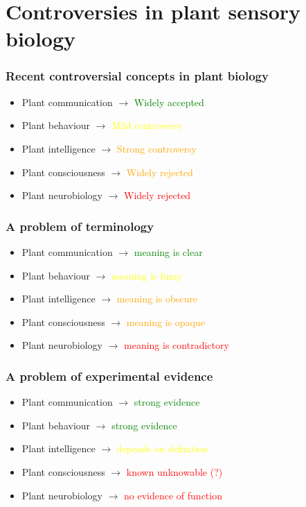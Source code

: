 \documentclass[10pt]{beamer}
\begin{document}
\section{Controversies in plant sensory biology}

\begin{frame}
\frametitle{Recent controversial concepts in plant biology}
\begin{itemize}
\item Plant communication $\rightarrow$ \textcolor{green}{Widely accepted}
\item Plant behaviour $\rightarrow$ \textcolor{yellow}{Mild controversy}
\item Plant intelligence $\rightarrow$ \textcolor{orange}{Strong controversy}
\item Plant consciousness $\rightarrow$ \textcolor{orange}{Widely rejected}
\item Plant neurobiology $\rightarrow$ \textcolor{red}{Widely rejected}
\end{itemize}
\end{frame}

\begin{frame}
\frametitle{A problem of terminology}
\begin{itemize}
\item Plant communication $\rightarrow$ \textcolor{green}{meaning is clear}
\item Plant behaviour $\rightarrow$ \textcolor{yellow}{meaning is fuzzy}
\item Plant intelligence $\rightarrow$ \textcolor{orange}{meaning is obscure}
\item Plant consciousness $\rightarrow$ \textcolor{orange}{meaning is opaque}
\item Plant neurobiology $\rightarrow$ \textcolor{red}{meaning is contradictory}
\end{itemize}
\end{frame}

\begin{frame}
\frametitle{A problem of experimental evidence}
\begin{itemize}
\item Plant communication $\rightarrow$ \textcolor{green}{strong evidence}
\item Plant behaviour $\rightarrow$ \textcolor{green}{strong evidence}
\item Plant intelligence $\rightarrow$ \textcolor{yellow}{depends on definition}
\item Plant consciousness $\rightarrow$ \textcolor{red}{known unknowable (?)}
\item Plant neurobiology $\rightarrow$ \textcolor{red}{no evidence of function}
\end{itemize}
\end{frame}
\end{document}

